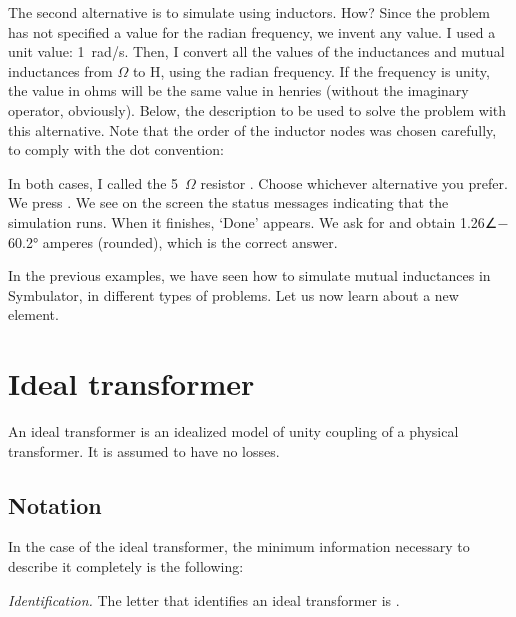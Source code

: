 
The second alternative is to simulate using inductors. How? Since
the problem has not specified a value for the radian frequency, we
invent any value. I used a unit value: 1~rad/s. Then, I convert all
the values of the inductances and mutual inductances from $\Omega$
to H, using the radian frequency. If the frequency is unity, the
value in ohms will be the same value in henries (without the
imaginary operator, obviously). Below, the description to be used to
solve the problem with this alternative. Note that the order of the
inductor nodes was chosen carefully, to comply with the dot
convention:


In both cases, I called the 5~$\Omega$ resistor . Choose
whichever alternative you prefer. We press . We see on
the screen the status messages indicating that the simulation runs.
When it finishes, `Done' appears. We ask for  and
obtain 1.26∠$-$60.2° amperes (rounded), which is the correct answer.

In the previous examples, we have seen how to simulate mutual
inductances in Symbulator, in different types of problems. Let us
now learn about a new element.

\section{Ideal transformer}

An ideal transformer is an idealized model of unity coupling of a
physical transformer. It is assumed to have no losses.

\subsection{Notation}

In the case of the ideal transformer, the minimum information
necessary to describe it completely is the following:

\emph{Identification.} The letter that identifies an ideal
transformer is .

